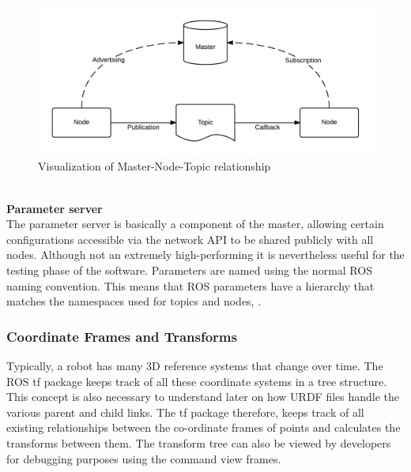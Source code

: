 \begin{figure}[H]
    \centering
    \includegraphics{Images/Chapter 2/ROS-master-node-topic.png}
    \caption{Visualization of Master-Node-Topic relationship}
    \label{fig:master-node-topic}
\end{figure}
\\
\newline
\textbf{Parameter server}\\
The parameter server is basically a component of the master, allowing certain configurations accessible via the network API to be shared publicly with all nodes. Although not an extremely high-performing it is nevertheless useful for the testing phase of the software. Parameters are named using the normal ROS naming convention. This means that ROS parameters have a hierarchy that matches the namespaces used for topics and nodes, \citet{rosparmserv}.

\subsubsection{Coordinate Frames and Transforms}
Typically, a robot has many 3D reference systems that change over time. The ROS tf package keeps track of all these coordinate systems in a tree structure. This concept is also necessary to understand later on how URDF files handle the various parent and child links. The tf package therefore, keeps track of all existing relationships between the co-ordinate frames of points and calculates the transforms between them. The transform tree can also be viewed by developers for debugging purposes using the command view frames. 

